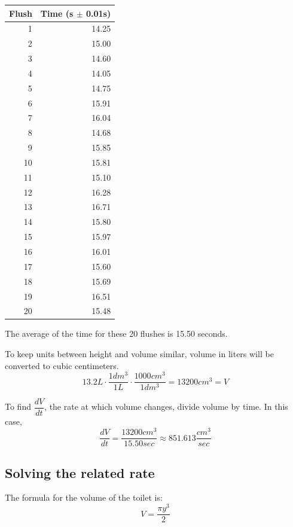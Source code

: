 \documentclass[12pt, titlepage]{article}
\begin{document}
\begin{center}
\begin{tabular}{rr}
Flush & Time (s \(\pm\) 0.01s)\\
\hline
1 & 14.25\\
2 & 15.00\\
3 & 14.60\\
4 & 14.05\\
5 & 14.75\\
6 & 15.91\\
7 & 16.04\\
8 & 14.68\\
9 & 15.85\\
10 & 15.81\\
11 & 15.10\\
12 & 16.28\\
13 & 16.71\\
14 & 15.80\\
15 & 15.97\\
16 & 16.01\\
17 & 15.60\\
18 & 15.69\\
19 & 16.51\\
20 & 15.48\\
\end{tabular}
\end{center}

The average of the time for these 20 flushes is 15.50 seconds. 

To keep units between height and volume similar, volume in liters will be converted to cubic centimeters.
\begin{equation}
  13.2 L \cdot \frac{1 dm^{3}}{1 L} \cdot \frac{1000 cm^{3}}{1 dm^{3}} = 13200 cm^{3} = V
\end{equation}

To find \(\dfrac{dV}{dt}\), the rate at which volume changes, divide volume by time. In this case,
\begin{equation}
  \dfrac{dV}{dt} = \dfrac{13200 cm^{3}}{15.50 sec} \approx 851.613 \dfrac{cm^{3}}{sec}
\end{equation}

\subsection{Solving the related rate}
The formula for the volume of the toilet is:
\begin{equation}
    V = \frac{\pi y^3}{2}
\end{equation}
\end{document}

